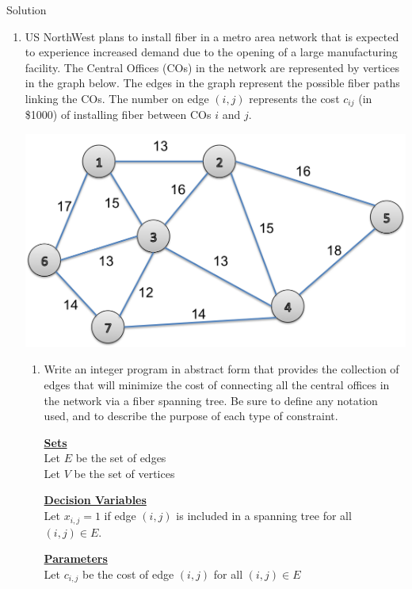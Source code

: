 \documentclass[letterpaper,oneside,12pt]{article}%
\newcommand{\blu}{\color{blue}}
\begin{document}
\noindent{}

\bigskip

{
\blu
Solution
}

\begin{enumerate}
\item US NorthWest plans to install fiber in a metro area network that is expected to experience increased demand due to the opening of a large manufacturing facility.  The Central Offices (COs) in the network are represented by vertices in the graph below.  The edges in the graph represent the possible fiber paths linking the COs.  The number on edge $(i,j)$ represents the cost $c_{ij}$ (in \$1000) of installing fiber between COs $i$ and $j$.

\begin{center}
\includegraphics[width = .5\textwidth]{uswest_network}
\end{center}

\begin{enumerate}
\item Write an integer program in abstract form that provides the collection of edges that will minimize the cost of connecting all the central offices in the network via a fiber spanning tree.  Be sure to define any notation used, and to describe the purpose of each type of constraint.

{ \blu
\textbf{\underline{Sets}} \\
Let $E$ be the set of edges \\
Let $V$ be the set of vertices

\textbf{\underline{Decision Variables}} \\

Let $x_{i,j} = 1$ if edge $(i,j)$ is included in a spanning tree for all $(i,j) \in E$.

\textbf{\underline{Parameters}} \\

Let $c_{i,j}$ be the cost of edge $(i,j)$ for all $(i,j) \in E$

}
\end{enumerate}
\end{enumerate}
\end{document}
